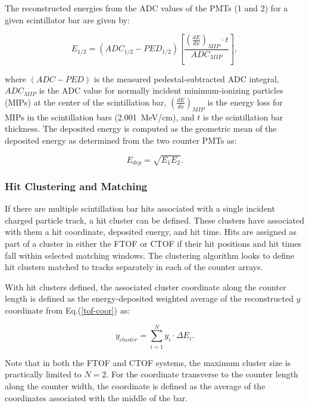 The reconstructed energies from the ADC values of the PMTs (1 and 2) for a given scintillator bar are given by:

\begin{equation}
E_{1/2} = (ADC_{1/2} - PED_{1/2}) \left [ \frac{\left( \frac{dE}{dx} \right )_{MIP} \cdot t}{ADC_{MIP}} \right ],
\end{equation}

\noindent
where $(ADC-PED)$ is the measured pedestal-subtracted ADC integral, $ADC_{MIP}$ is the ADC value for
normally incident minimum-ionizing particles (MIPs) at the center of the scintillation bar,
$\left( \frac{dE}{dx} \right)_{MIP}$ is the energy loss for MIPs in the scintillation bars (2.001~MeV/cm), and
$t$ is the scintillation bar thickness. The deposited energy is computed as the geometric mean of the deposited
energy as determined from the two counter PMTs as:

\begin{equation}
E_{dep} = \sqrt{E_1 E_2}.
\end{equation}

\subsubsection{Hit Clustering and Matching}
\label{sec:tof-cluster}

If there are multiple scintillation bar hits associated with a single incident charged particle track, a hit cluster
can be defined. These clusters have associated with them a hit coordinate, deposited energy, and hit time. Hits
are assigned as part of a cluster in either the FTOF or CTOF if their hit positions and hit times fall within selected
matching windows. The clustering algorithm looks to define hit clusters matched to tracks separately in each of the
counter arrays.

With hit clusters defined, the associated cluster coordinate along the counter length is defined as the
energy-deposited weighted average of the reconstructed $y$ coordinate from Eq.(\ref{tof-coor}) as:

\begin{equation}
y_{cluster} = \sum_{i=1}^{N} y_i \cdot \Delta E_i.
\end{equation}

\noindent
Note that in both the FTOF and CTOF systems, the maximum cluster size is practically limited to $N=2$. For the
coordinate transverse to the counter length along the counter width, the coordinate is defined as the average of
the coordinates associated with the middle of the bar.

